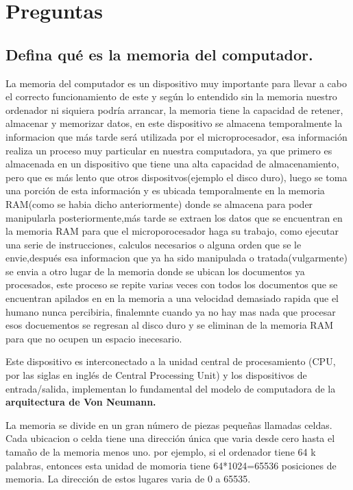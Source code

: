 \documentclass{article}
\begin{document}
\section{Preguntas} \label{contenido}

\subsection{Defina qué es la memoria del computador.}
\noindent
La memoria del computador es un dispositivo muy importante para llevar a cabo el correcto funcionamiento de este y según lo entendido sin la memoria nuestro ordenador ni siquiera podría arrancar, la memoria tiene la capacidad de retener, almacenar y memorizar datos, en este dispositivo se almacena temporalmente la informacion que más tarde será utilizada por el microprocesador, esa información realiza un proceso muy particular en nuestra computadora, ya que primero es almacenada en un dispositivo que tiene una alta capacidad de almacenamiento, pero que es más lento que otros dispositvos(ejemplo el disco duro), luego se toma una porción de esta información y es ubicada temporalmente en la memoria RAM(como se habia dicho anteriormente) donde se almacena para poder manipularla posteriormente,más tarde se extraen los datos que se encuentran en la memoria RAM para que el microporocesador haga su trabajo, como ejecutar una serie de instrucciones, calculos necesarios o alguna orden que se le envie,después esa informacion que ya ha sido manipulada o tratada(vulgarmente) se envia a otro lugar de la memoria donde se ubican los documentos ya procesados, este proceso se repite varias veces con todos los documentos que se encuentran apilados en en la memoria a una velocidad demasiado rapida que el humano nunca percibiria, finalemnte cuando ya no hay mas nada que procesar esos docuementos se regresan al disco duro y se eliminan de la memoria RAM para que no ocupen un espacio inecesario. 

\vspace{0.5cm}
\noindent
Este dispositivo es interconectado a la unidad central de procesamiento (CPU, por las siglas en inglés de Central Processing Unit) y los dispositivos de entrada/salida, implementan lo fundamental del modelo de computadora de la \textbf{arquitectura de Von Neumann.}\cite{geniolandia}

\vspace{0.5cm}
\noindent
La memoria se divide en un gran número de piezas pequeñas llamadas celdas. Cada ubicacion o celda tiene una dirección única que varia desde cero hasta el tamaño de la memoria menos uno. por ejemplo, si el ordenador tiene 64 k palabras, entonces esta unidad de momoria tiene 64*1024=65536 posiciones de memoria. La dirección de estos lugares varia de 0 a 65535. \cite{tutorialspoint}
\end{document}
